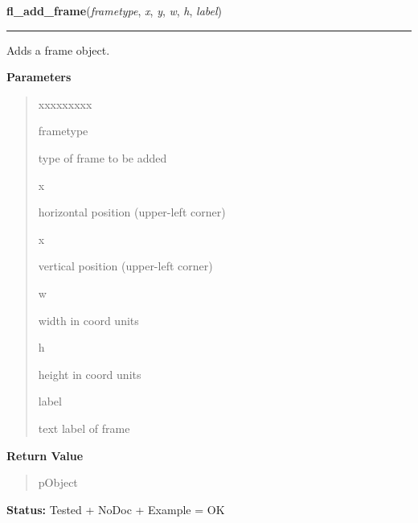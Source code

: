     \label{xformslib:library:fl_add_frame}

    \vspace{0.5ex}

\hspace{.8\funcindent}\begin{boxedminipage}{\funcwidth}

    \raggedright \textbf{fl\_add\_frame}(\textit{frametype}, \textit{x}, \textit{y}, \textit{w}, \textit{h}, \textit{label})

    \vspace{-1.5ex}

    \rule{\textwidth}{0.5\fboxrule}
\setlength{\parskip}{2ex}
    Adds a frame object.

\setlength{\parskip}{1ex}
      \textbf{Parameters}
      \vspace{-1ex}

      \begin{quote}
        \begin{Ventry}{xxxxxxxxx}

          \item[frametype]

          type of frame to be added

          \item[x]

          horizontal position (upper-left corner)

          \item[x]

          vertical position (upper-left corner)

          \item[w]

          width in coord units

          \item[h]

          height in coord units

          \item[label]

          text label of frame

        \end{Ventry}

      \end{quote}

      \textbf{Return Value}
    \vspace{-1ex}

      \begin{quote}
      pObject

      \end{quote}

\textbf{Status:} Tested + NoDoc + Example = OK



    \end{boxedminipage}

